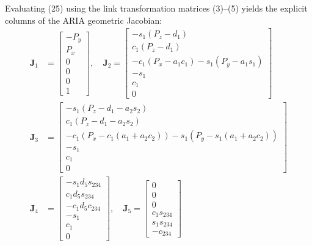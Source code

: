 \documentclass[journal]{IEEEtran}
\begin{document}
Evaluating (25) using the link transformation matrices (3)–(5) yields the explicit columns of the ARIA geometric Jacobian:
\begin{align}
\mathbf{J}_1 &= \begin{bmatrix} -P_y \\ P_x \\ 0 \\ 0 \\ 0 \\ 1 \end{bmatrix}, \quad
\mathbf{J}_2 = \begin{bmatrix} -s_1 (P_z - d_1) \\ c_1 (P_z - d_1) \\ -c_1 (P_x - a_1 c_1) - s_1 (P_y - a_1 s_1) \\ -s_1 \\ c_1 \\ 0 \end{bmatrix} \\
\mathbf{J}_3 &= \begin{bmatrix} -s_1 (P_z - d_1 - a_2 s_2) \\ c_1 (P_z - d_1 - a_2 s_2) \\ -c_1 (P_x - c_1(a_1 + a_2 c_2)) - s_1 (P_y - s_1(a_1 + a_2 c_2)) \\ -s_1 \\ c_1 \\ 0 \end{bmatrix} \\
\mathbf{J}_4 &= \begin{bmatrix} -s_1 d_5 s_{234} \\ c_1 d_5 s_{234} \\ -c_1 d_5 c_{234} \\ -s_1 \\ c_1 \\ 0 \end{bmatrix}, \quad
\mathbf{J}_5 = \begin{bmatrix} 0 \\ 0 \\ 0 \\ c_1 s_{234} \\ s_1 s_{234} \\ -c_{234} \end{bmatrix}
\end{align}
\end{document}
